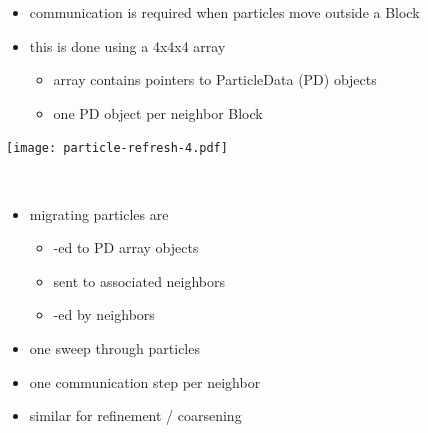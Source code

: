 
\begin{frame}[fragile,label=ss-particles] 
\begin{itemize}
\item communication is required when particles move outside a Block 
\item this is done using a 4x4x4 array
\begin{itemize}
\item array contains pointers to ParticleData (PD) objects
\item one PD object per neighbor Block
\end{itemize}

\end{itemize}
\begin{minipage}{1.8in}
\texttt{[image: particle-refresh-4.pdf]}
\end{minipage} \ 
\begin{minipage}{2.7in}
\begin{itemize}
\item migrating particles are
\begin{itemize}
\item {}-ed to PD array objects
\item sent to associated neighbors
\item {}-ed by neighbors
\end{itemize}
\item one sweep through particles
\item one communication step per neighbor
\item similar for refinement / coarsening
\end{itemize}
\end{minipage}
\end{frame}


